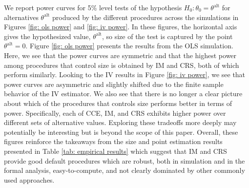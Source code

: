 \documentclass[preprint]{imsart}
\numberwithin{equation}{section}
\theoremstyle{plain}
\theoremstyle{definition}
\renewcommand{\(}{\left(}
\renewcommand{\)}{\right)}
\renewcommand{\[}{\left[}
\renewcommand{\]}{\right]}
\begin{document}
We report power curves for 5\% level tests of the hypothesis $H_0: \theta_0 = \theta^{\mathrm{alt}} $ for alternatives $\theta^{\mathrm{alt}} $ produced by the different procedures across the simulations in Figures \ref{fig: ols power} and \ref{fig: iv power}. In these figures, the horizontal axis gives the hypothesized value, $\theta^{\mathrm{alt}} $, so size of the test is captured by the point $\theta^{\mathrm{alt}}  = 0$. Figure \ref{fig: ols power} presents the results from the OLS simulation. Here, we see that the power curves are symmetric and that the highest power among procedures that control size is obtained by IM and CRS, both of which perform similarly. Looking to the IV results in Figure \ref{fig: iv power}, we see that power curves are asymmetric and slightly shifted due to the finite sample behavior of the IV estimator. We also see that there is no longer a clear picture about which of the procedures that controls size performs better in terms of power. Specifically, each of CCE, IM, and CRS exhibits higher power over different sets of alternative values. Exploring these tradeoffs more deeply may potentially be interesting but is beyond the scope of this paper. Overall, these figures reinforce the takeaways from the size and point estimation results presented in Table \ref{tab: empirical results} which suggest that IM and CRS provide good default procedures which are robust, both in simulation and in the formal analysis, easy-to-compute, and not clearly dominated by other commonly used approaches. 



\end{document}
